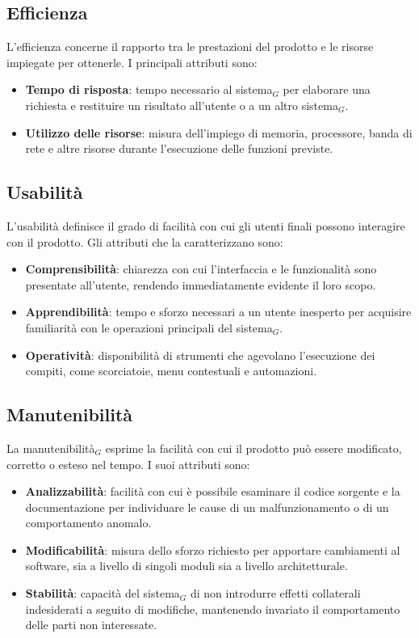 \documentclass[a4paper, 10pt]{article}
\begin{document}
\subsection{Efficienza}
\label{subsec:efficienza}

L'efficienza concerne il rapporto tra le prestazioni del prodotto e le risorse impiegate per ottenerle. I principali attributi sono:
\begin{itemize}
    \item \textbf{Tempo di risposta}: tempo necessario al sistema$_G$ per elaborare una richiesta e restituire un risultato all'utente o a un altro sistema$_G$.
    \item \textbf{Utilizzo delle risorse}: misura dell'impiego di memoria, processore, banda di rete e altre risorse durante l'esecuzione delle funzioni previste.
\end{itemize}

\subsection{Usabilità}
\label{subsec:usabilita}

L'usabilità definisce il grado di facilità con cui gli utenti finali possono interagire con il prodotto. Gli attributi che la caratterizzano sono:
\begin{itemize}
    \item \textbf{Comprensibilità}: chiarezza con cui l'interfaccia e le funzionalità sono presentate all'utente, rendendo immediatamente evidente il loro scopo.
    \item \textbf{Apprendibilità}: tempo e sforzo necessari a un utente inesperto per acquisire familiarità con le operazioni principali del sistema$_G$.
    \item \textbf{Operatività}: disponibilità di strumenti che agevolano l'esecuzione dei compiti, come scorciatoie, menu contestuali e automazioni.
\end{itemize}

\subsection{Manutenibilità}
\label{subsec:manutenibilita}

La manutenibilità$_G$ esprime la facilità con cui il prodotto può essere modificato, corretto o esteso nel tempo. I suoi attributi sono:
\begin{itemize}
    \item \textbf{Analizzabilità}: facilità con cui è possibile esaminare il codice sorgente e la documentazione per individuare le cause di un malfunzionamento o di un comportamento anomalo.
    \item \textbf{Modificabilità}: misura dello sforzo richiesto per apportare cambiamenti al software, sia a livello di singoli moduli sia a livello architetturale.
    \item \textbf{Stabilità}: capacità del sistema$_G$ di non introdurre effetti collaterali indesiderati a seguito di modifiche, mantenendo invariato il comportamento delle parti non interessate.
\end{itemize}
\end{document}
